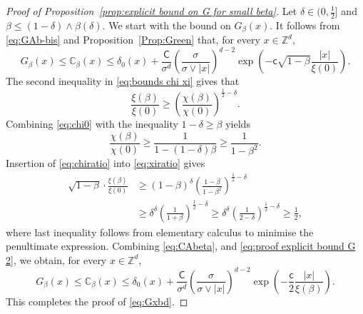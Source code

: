 \documentclass[11pt,a4paper]{article}
\numberwithin{equation}{section}
\theoremstyle{plain}
\theoremstyle{definition}
\newcommand\1{\mathds{1}}
\newcommand\CGreen{\mathsf{C}}
\newcommand\cGreen{\mathsf{c}}
\begin{document}
\begin{proof}[Proof of Proposition~\textup{\ref{prop:explicit bound on G for small beta}}] Let $\delta \in (0,\tfrac{1}{2}]$
and $\beta\leq (1-\delta)\wedge \beta(\delta)$. We start with the bound on $G_\beta(x)$. It follows from \eqref{eq:GAb-bis} and Proposition~\ref{Prop:Green} that, for every $x\in \mathbb Z^d$,
\begin{equation}
\label{eq:CAbeta}
    G_\beta(x) \le  \mathbb C_{\beta}(x)
    \leq \delta_0(x)+ \frac{\CGreen}{\sigma^d}
    \left( \frac{\sigma}{\sigma \vee|x| } \right)^{d-2}
    \exp\left(-\cGreen\sqrt{1-\beta}\frac{|x|}{\xi(0)} \right).\end{equation}
The second inequality in
\eqref{eq:bounds chi xi} gives that
\begin{equation}
\label{eq:xiratio}
	\frac{\xi(\beta)}{\xi(0)}\geq \left(\frac{\chi(\beta)}{\chi(0)}\right)^{\tfrac{1}{2}-\delta}.
\end{equation}
Combining \eqref{eq:chi0} with the inequality $1-\delta \ge \beta$ yields
\begin{equation}
\label{eq:chiratio}
	\frac{\chi(\beta)}{\chi(0)}\geq \frac{1}{1-(1-\delta)\beta}
    \geq \frac{1}{1-\beta^2}.
\end{equation}
Insertion of \eqref{eq:chiratio} into \eqref{eq:xiratio} gives
\begin{align}
	\sqrt{1-\beta}\cdot\frac{\xi(\beta)}{\xi(0)}
    &\geq (1-\beta)^{\delta}\left(\frac{1-\beta}{1-\beta^2}\right)^{\tfrac{1}{2}-\delta}
	\nonumber\\&\geq\delta^{\delta}\left(\frac{1}{1+\beta}\right)^{\tfrac{1}{2}-\delta}
	 \geq \delta^{\delta}\left(\frac{1}{2-\delta}\right)^{\tfrac{1}{2}-\delta}
	 \geq
   \frac 12
    ,
\label{eq:proof explicit bound G 2}
\end{align}
where last inequality follows from elementary calculus to
minimise the penultimate expression. Combining \eqref{eq:CAbeta}, and \eqref{eq:proof explicit bound G 2},
we obtain, for every $x\in \mathbb Z^d$,
\begin{equation}
\label{eq:proof explicit bound G 3}
	G_\beta(x)
    \le \mathbb C_\beta(x)\leq
    \delta_0(x)+\frac{\CGreen}{\sigma^d}
    \left( \frac{\sigma}{\sigma \vee|x| } \right)^{d-2}
    \exp\left(-\frac{\cGreen}{2} \frac{|x|}{\xi(\beta)} \right).
\end{equation}
This completes the proof of \eqref{eq:Gxbd}.


\end{proof}
\end{document}
